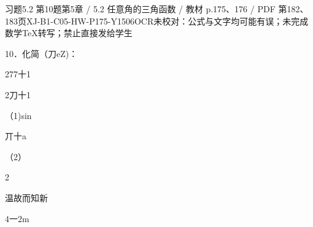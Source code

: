 \begin{bankitem}{习题5.2 第10题}{第5章 / 5.2 任意角的三角函数 / 教材 p.175、176 / PDF 第182、183页}{XJ-B1-C05-HW-P175-Y1506}{OCR未校对：公式与文字均可能有误；未完成数学TeX转写；禁止直接发给学生}
\begin{ocrdraft}
\par
10．化简（刀eZ)：
\par
277十1
\par
2刀十1
\par
（1)sin
\par
丌十a
\par
（2）
\par
2
\par
[教材p.176 / PDF第183页]
\par
温故而知新
\par
4一2m
\end{ocrdraft}
\end{bankitem}
